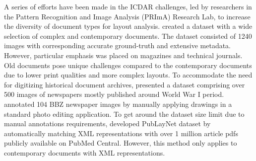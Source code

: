 \documentclass[letterpaper]{article} %
\begin{document}
A series of efforts have been made in the ICDAR challenges, led by researchers in the Pattern Recognition and Image Analysis (PRImA) Research Lab, to increase the diversity of document types for layout analysis. \cite{DBLP:conf/icdar/AntonacopoulosBPP09} created a dataset with a wide selection of complex and contemporary documents. The dataset consisted of 1240 images with corresponding accurate ground-truth and extensive metadata. However, particular emphasis was placed on magazines and technical journals. Old documents pose unique challenges compared to the contemporary documents due to lower print qualities and more complex layouts. To accommodate the need for digitizing historical document archives, \cite{DBLP:conf/icdar/ClausnerPPA15} presented a dataset comprising over 500 images of newspapers mostly published around World War I period.
\cite{DBLP:conf/icpr/LieblB20} annotated 104 BBZ newspaper images by manually applying drawings
in a standard photo editing application. To get around the dataset size limit due to manual annotations requirements, \cite{DBLP:conf/icdar/ZhongTJ19} developed PubLayNet dataset by automatically matching XML representations with over 1 million article pdfs publicly available on PubMed Central. However, this method only applies to contemporary documents with XML representations.
\end{document}
